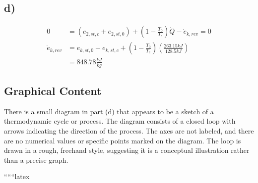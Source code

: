 \subsection*{d)}

\begin{align*}
0 &= (e_{2,st,c} + e_{2,st,0}) + \left( 1 - \frac{T_0}{T_e} \right) \dot{Q} - \dot{e}_{k,rev} = 0 \\
\dot{e}_{k,rev} &= e_{k,st,0} - e_{k,st,c} + \left( 1 - \frac{T_0}{T_e} \right) \left( \frac{263.15 kJ}{128.5 kJ} \right) \\
&= 848.78 \frac{kJ}{kg}
\end{align*}

\subsection*{Graphical Content}

There is a small diagram in part (d) that appears to be a sketch of a thermodynamic cycle or process. The diagram consists of a closed loop with arrows indicating the direction of the process. The axes are not labeled, and there are no numerical values or specific points marked on the diagram. The loop is drawn in a rough, freehand style, suggesting it is a conceptual illustration rather than a precise graph.

``````latex


